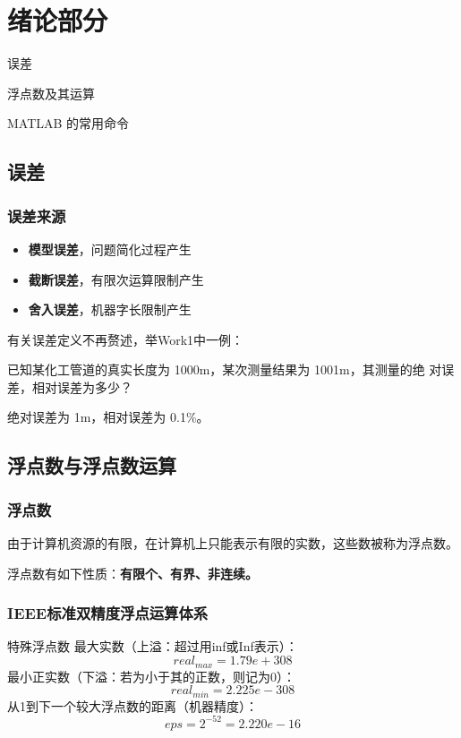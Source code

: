 \chapter*{绪论部分}
\begin{introduction}
\item 误差
\item 浮点数及其运算
\item MATLAB 的常用命令
\end{introduction}
\section{误差}
\subsection{误差来源}
\begin{itemize}
  \item \textbf{模型误差}，问题简化过程产生
  \item \textbf{截断误差}，有限次运算限制产生
  \item \textbf{舍入误差}，机器字长限制产生
\end{itemize}
有关误差定义不再赘述，举Work1中一例：
\begin{problem}
已知某化工管道的真实长度为 1000m，某次测量结果为 1001m，其测量的绝
对误差，相对误差为多少？
\end{problem}

\begin{solution}
绝对误差为 1m，相对误差为 0.1\%。
\end{solution}

\section{浮点数与浮点数运算}
\subsection{浮点数}
由于计算机资源的有限，在计算机上只能表示有限的实数，这些数被称为浮点数。

浮点数有如下性质：\textbf{有限个、有界、非连续。}
\subsection{IEEE标准双精度浮点运算体系}

\begin{definition}{特殊浮点数}{}
最大实数（上溢：超过用inf或Inf表示）：
\[real_{max}=1.79e+308
\]
最小正实数（下溢：若为小于其的正数，则记为0）：
\[real_{min}=2.225e-308
\]
从1到下一个较大浮点数的距离（机器精度）：
\[eps=2^{-52}=2.220e-16
\]
\end{definition}
